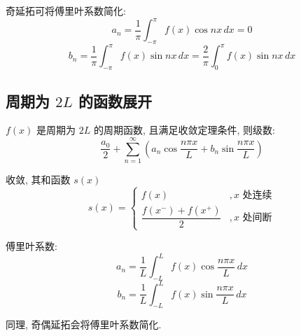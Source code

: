 \documentclass[UTF8]{ctexart}
\begin{document}
奇延拓可将傅里叶系数简化:
\[ a_n = \dfrac{1}{\pi} \int_{-\pi}^\pi f(x) \cos nx \,dx = 0 \]
\[ b_n = \dfrac{1}{\pi} \int_{-\pi}^\pi f(x) \sin nx \,dx = \dfrac{2}{\pi} \int_{0}^{\pi} f(x) \sin nx \,dx \]

\newpage
\subsection{周期为 $ 2 L $ 的函数展开}
$ f(x) $ 是周期为 $ 2 L $ 的周期函数, 且满足收敛定理条件, 则级数:
\[ \dfrac{a_0}{2} + \sum_{n = 1}^{\infty}\left( a_n \cos \dfrac{n \pi x}{L} + b_n \sin \dfrac{n \pi x}{L} \right) \]

收敛, 其和函数 $ s(x) $
\[ s(x) = \begin{cases}
    f(x) &, x \text{ 处连续} \\[1em]
    \dfrac{f(x^-) + f(x^+)}{2} &, x \text{ 处间断}
\end{cases}\]

傅里叶系数:
\[ a_n = \dfrac{1}{L} \int_{-L}^L f(x) \cos \dfrac{n \pi x}{L} \,dx \]
\[ b_n = \dfrac{1}{L} \int_{-L}^L f(x) \sin \dfrac{n \pi x}{L} \,dx \]

同理, 奇偶延拓会将傅里叶系数简化.







\newpage
\end{document}
